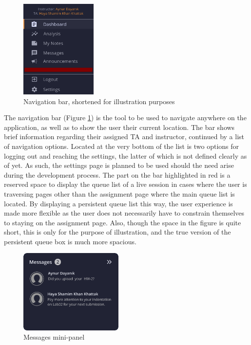 \documentclass[a4paper, 12pt]{article}
\begin{document}
    \begin{figure}
        \centering
        \vspace{-15pt}
        \includegraphics[width=0.34\textwidth]{navbar_short}
        \caption{Navigation bar, shortened for illustration purposes}
        \label{fig:navbar_short}
    \end{figure}
    
    The navigation bar (Figure \ref{fig:navbar_short}) is the tool to be used to navigate
    anywhere on the application, as well as to show the user their current location. The bar shows brief information regarding
    their assigned TA and instructor, continued by a list of navigation options. Located at the very bottom of the list is two
    options for logging out and reaching the settings, the latter of which is not defined clearly as of yet. As such, the settings
    page is planned to be used should the need arise during the development process. The part on the bar highlighted in red is 
    a reserved space to display the queue list of a live session in cases where the user is traversing pages other than the assignment page
    where the main queue list is located. By displaying a persistent queue list this way, the user experience is made more flexible as
    the user does not necessarily have to constrain themselves to staying on the assignment page. Also, though the space in the figure
    is quite short, this is only for the purpose of illustration, and the true version of the persistent queue box is much more spacious.
    
    \begin{figure}
        \centering
        \vspace{-15pt}
        \includegraphics[width=0.46\textwidth]{messages_panel}
        \caption{Messages mini-panel}
        \label{fig:messages_panel}
    \end{figure}
    
\end{document}
